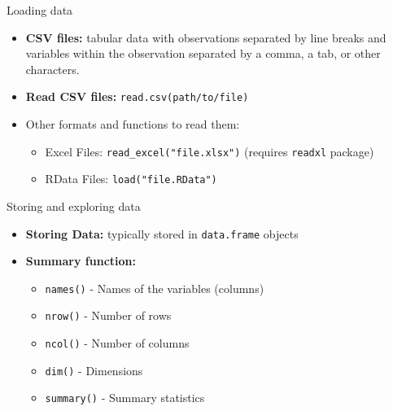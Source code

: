 \documentclass[aspectratio=169]{beamer}
\begin{document}
\begin{frame}{Loading data}

    \begin{itemize}
        \item \textbf{CSV files:} tabular data with observations separated by line breaks and variables within the observation separated by a comma, a tab, or other characters.\smallskip
        \item \textbf{Read CSV files:} \texttt{read.csv(path/to/file)}\smallskip
        \item Other formats and functions to read them:
        \begin{itemize}
            \item[$\bullet$] Excel Files: \texttt{read\_excel("file.xlsx")} (requires \texttt{readxl} package)
            \item[$\bullet$] RData Files: \texttt{load("file.RData")}
        \end{itemize}
    \end{itemize}
    
\end{frame}

\begin{frame}{Storing and exploring data}

    \begin{itemize}
        \item \textbf{Storing Data:} typically stored in \texttt{data.frame} objects\smallskip
        \item \textbf{Summary function:}
        \begin{itemize}
            \item[$\bullet$] \texttt{names()} - Names of the variables (columns)
            \item[$\bullet$] \texttt{nrow()} - Number of rows
            \item[$\bullet$] \texttt{ncol()} - Number of columns
            \item[$\bullet$] \texttt{dim()} - Dimensions
            \item[$\bullet$] \texttt{summary()} - Summary statistics
        \end{itemize}
            
    \end{itemize}
    
\end{frame}
\end{document}
